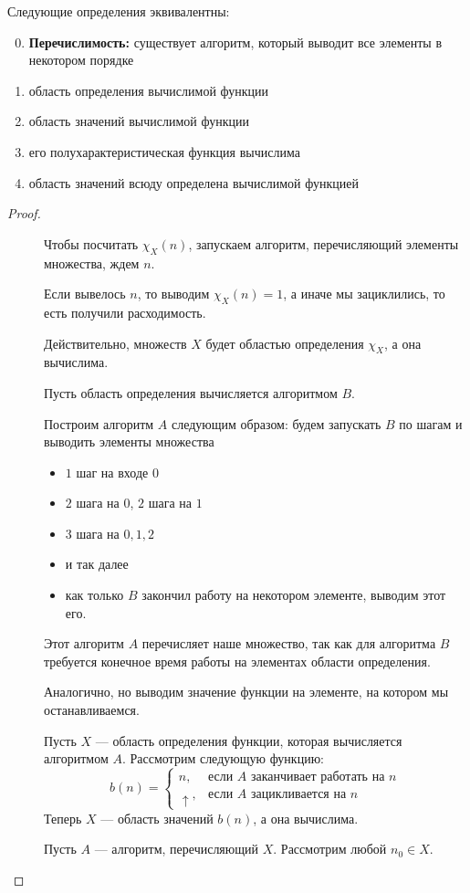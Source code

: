 \begin{thm}
    Следующие определения эквивалентны:
    \begin{enumerate}
		\setcounter{enumi}{-1}
		\item \textbf{Перечислимость:} существует алгоритм, который выводит все элементы в некотором порядке
		\item область определения вычислимой функции
		\item область значений вычислимой функции
		\item его полухарактеристическая функция вычислима
		\item область значений  всюду определена вычислимой функцией
    \end{enumerate} 
\end{thm}
\begin{proof}
    ~\begin{description}
		\item[]
	    Чтобы посчитать $ \chi_{X}(n)$, запускаем алгоритм, перечисляющий элементы множества, ждем $ n$.

	    Если вывелось $ n$, то выводим $ \chi_{X}(n) = 1$, а иначе мы зациклились, то есть получили расходимость.
	\item[] 
	    Действительно, множеств $ X$ будет областью определения $ \chi_{X}$, а она вычислима. 
	\item[]
	    Пусть область определения вычисляется алгоритмом  $ B$.

	    Построим алгоритм $ A$ следующим образом: будем запускать $ B$ по шагам и выводить элементы множества
	    \begin{itemize}
		\item $ 1$ шаг на входе $ 0$
		\item $ 2$ шага на $ 0$, $ 2$ шага на $ 1$
		\item $ 3$ шага на $ 0, 1, 2$
		 \item и так далее
		 \item как только $ B$ закончил работу на некотором элементе, выводим этот его.
	    \end{itemize}
	    Этот алгоритм $ A$ перечисляет наше множество, так как для алгоритма $ B$ требуется конечное время работы на элементах области определения.
	\item[]
			Аналогично, но выводим значение функции на элементе, на котором мы останавливаемся.
		\item[]
			Пусть $ X$ --- область определения функции, которая вычисляется алгоритмом $ A$.
			Рассмотрим следующую функцию:
			\[
				b(n) = \begin{cases}
					n, & \text{если } A \text{ заканчивает работать на } n \\
					\uparrow , & \text{если } A \text{ зацикливается на } n
				\end{cases}
			\] 
			Теперь $ X$ --- область значений $ b(n)$, а она вычислима.
		\item[] 
			Пусть $ A$ --- алгоритм, перечисляющий $ X$. Рассмотрим любой $ n_0 \in X$.


\end{description}
\end{proof}
